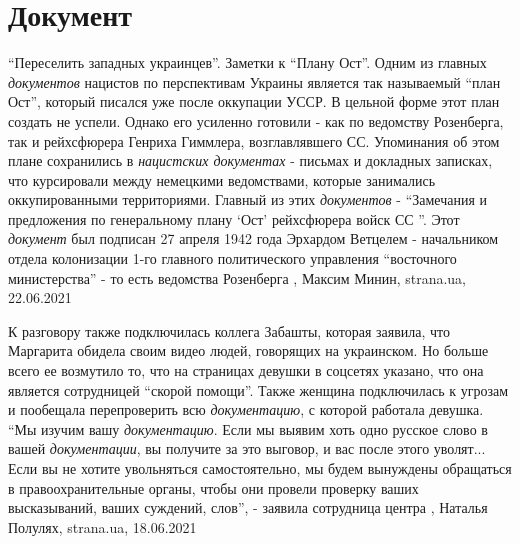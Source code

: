 
 
 
 
 
\chapter{Документ}
\label{sec:slova.dokument}

\enquote{Переселить западных украинцев}. Заметки к \enquote{Плану Ост}.  Одним
из главных \emph{документов} нацистов по перспективам Украины является так
называемый \enquote{план Ост}, который писался уже после оккупации УССР.  В
цельной форме этот план создать не успели. Однако его усиленно готовили - как
по ведомству Розенберга, так и рейхсфюрера Генриха Гиммлера, возглавлявшего СС.
Упоминания об этом плане сохранились в \emph{нацистских документах} - письмах и
докладных записках, что курсировали между немецкими ведомствами, которые
занимались оккупированными территориями.  Главный из этих \emph{документов} -
\enquote{Замечания и предложения по генеральному плану \enquote{Ост}
рейхсфюрера войск СС }. Этот \emph{документ} был подписан 27 апреля 1942 года
Эрхардом Ветцелем - начальником отдела колонизации 1-го главного политического
управления \enquote{восточного министерства} - то есть ведомства Розенберга
  , Максим Минин, strana.ua, 22.06.2021

К разговору также подключилась коллега Забашты, которая заявила, что Маргарита
обидела своим видео людей, говорящих на украинском. Но больше всего ее
возмутило то, что на страницах девушки в соцсетях указано, что она является
сотрудницей \enquote{скорой помощи}. Также женщина подключилась к угрозам и пообещала
перепроверить всю \emph{документацию}, с которой работала девушка.  \enquote{Мы изучим вашу
\emph{документацию}. Если мы выявим хоть одно русское слово в вашей \emph{документации}, вы
получите за это выговор, и вас после этого уволят... Если вы не хотите
увольняться самостоятельно, мы будем вынуждены обращаться в правоохранительные
органы, чтобы они провели проверку ваших высказываний, ваших суждений, слов}, -
заявила сотрудница центра 
,
Наталья Полулях, strana.ua, 18.06.2021
